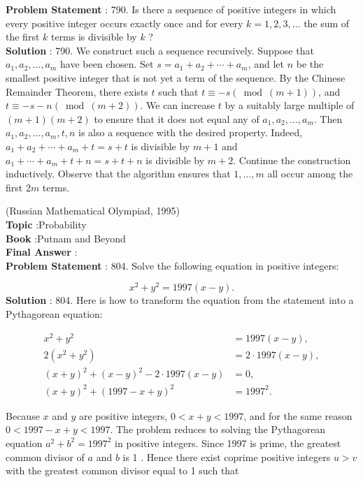 \documentclass[10pt]{article}
\begin{document}
\textbf{Problem Statement} :
790. Is there a sequence of positive integers in which every positive integer occurs exactly once and for every $k=1,2,3, \ldots$ the sum of the first $k$ terms is divisible by $k$ ?
\\
\textbf{Solution} :
790. We construct such a sequence recursively. Suppose that $a_{1}, a_{2}, \ldots, a_{m}$ have been chosen. Set $s=a_{1}+a_{2}+\cdots+a_{m}$, and let $n$ be the smallest positive integer that is not yet a term of the sequence. By the Chinese Remainder Theorem, there exists $t$ such that $t \equiv-s(\bmod (m+1))$, and $t \equiv-s-n(\bmod (m+2))$. We can increase $t$ by a suitably large multiple of $(m+1)(m+2)$ to ensure that it does not equal any of $a_{1}, a_{2}, \ldots, a_{m}$. Then $a_{1}, a_{2}, \ldots, a_{m}, t, n$ is also a sequence with the desired property. Indeed, $a_{1}+a_{2}+\cdots+a_{m}+t=s+t$ is divisible by $m+1$ and $a_{1}+\cdots+a_{m}+t+n=s+t+n$ is divisible by $m+2$. Continue the construction inductively. Observe that the algorithm ensures that $1, \ldots, m$ all occur among the first $2 m$ terms.

(Russian Mathematical Olympiad, 1995)
\\
\textbf{Topic} :Probability\\
\textbf{Book} :Putnam and Beyond\\
\textbf{Final Answer} :\\


\textbf{Problem Statement} :
804. Solve the following equation in positive integers:

$$
x^{2}+y^{2}=1997(x-y) .
$$
\textbf{Solution} :
804. Here is how to transform the equation from the statement into a Pythagorean equation:

$$
\begin{aligned}
x^{2}+y^{2} &=1997(x-y), \\
2\left(x^{2}+y^{2}\right) &=2 \cdot 1997(x-y), \\
(x+y)^{2}+(x-y)^{2}-2 \cdot 1997(x-y) &=0, \\
(x+y)^{2}+(1997-x+y)^{2} &=1997^{2} .
\end{aligned}
$$

Because $x$ and $y$ are positive integers, $0<x+y<1997$, and for the same reason $0<1997-x+y<1997$. The problem reduces to solving the Pythagorean equation $a^{2}+b^{2}=1997^{2}$ in positive integers. Since 1997 is prime, the greatest common divisor of $a$ and $b$ is 1 . Hence there exist coprime positive integers $u>v$ with the greatest common divisor equal to 1 such that
\end{document}
